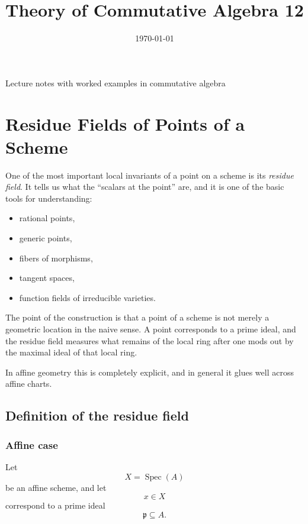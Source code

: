 \documentclass[12pt,a4paper]{article}
\title{\vspace{-1.5em}\bfseries Theory of Commutative Algebra 12}
\author{}
\date{\today}
\theoremstyle{notespace}
\newcommand{\Spec}{\operatorname{Spec}}
\newcommand{\p}{\mathfrak p}
\theoremstyle{definition}
\begin{document}
	\maketitle
	\thispagestyle{plain}
		\begin{center}
		\begin{minipage}{0.92\textwidth}
			Lecture notes with worked examples in commutative algebra
		\end{minipage}
	\end{center}
		\tableofcontents
	\clearpage
\section{Residue Fields of Points of a Scheme}

One of the most important local invariants of a point on a scheme is its \emph{residue field}.  
It tells us what the ``scalars at the point'' are, and it is one of the basic tools for understanding:

\begin{itemize}[leftmargin=2em]
	\item rational points,
	\item generic points,
	\item fibers of morphisms,
	\item tangent spaces,
	\item function fields of irreducible varieties.
\end{itemize}

The point of the construction is that a point of a scheme is not merely a geometric location in the naive sense.  
A point corresponds to a prime ideal, and the residue field measures what remains of the local ring after one mods out by the maximal ideal of that local ring.

In affine geometry this is completely explicit, and in general it glues well across affine charts.

\subsection{Definition of the residue field}

\subsubsection{Affine case}

Let
\[
X=\Spec(A)
\]
be an affine scheme, and let
\[
x\in X
\]
correspond to a prime ideal
\[
\p\subseteq A.
\]
\end{document}

